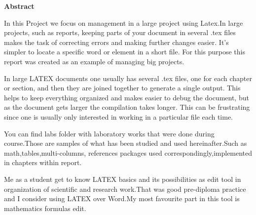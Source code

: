 
\begin{center} {\bf Abstract} \end{center}

In this Project  we focus on management in a large project using Latex.In large projects, such as reports, keeping parts of your document in several .tex files makes the task of correcting errors and making further changes easier. It's simpler to locate a specific word or element in a short file. For this purpose this report was created as an example of  managing big projects. \newline

In large LATEX documents one usually has several .tex files, one for each chapter or section, and then they are joined together to generate a single output. This helps to keep everything organized and makes easier to debug the document, but as the document gets larger the compilation takes longer. This can be frustrating since one is usually only interested in working in a particular file each time. \newline

You can find labs folder with laboratory works that were done during course.Those are samples of what has been studied and used hereinafter.Such as math,tables,multi-columns, references packages used correspondingly,implemented in chapters within report. \newline

 Me as a student get to know LATEX basics and its possibilities as edit tool in organization of scientific and research work.That was good pre-diploma  practice and I consider using LATEX over Word.My most favourite part in this tool is 
 mathematics formulas edit.


\clearpage 
